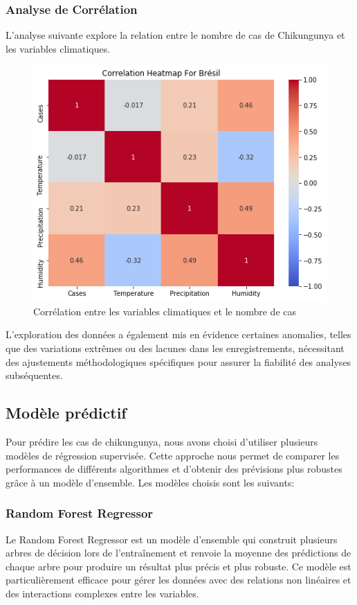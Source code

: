 \subsubsection*{Analyse de Corrélation}
L'analyse suivante explore la relation entre le nombre de cas de Chikungunya et les variables climatiques. 
\begin{figure}[h!]
	\centering
	\includegraphics[width=0.6\linewidth]{images/case_correlation}
	\caption[Corrélation entre les variables climatiques et le nombre de cas]{Corrélation entre les variables climatiques et le nombre de cas}
	\label{fig:casecorrelation}
\end{figure}

L'exploration des données a également mis en évidence certaines anomalies, telles que des variations extrêmes ou des lacunes dans les enregistrements, nécessitant des ajustements méthodologiques spécifiques pour assurer la fiabilité des analyses subséquentes.


\subsection{Modèle prédictif}
Pour prédire les cas de chikungunya, nous avons choisi d'utiliser plusieurs modèles de régression supervisée. Cette approche nous permet de comparer les performances de différents algorithmes et d'obtenir des prévisions plus robustes grâce à un modèle d'ensemble. Les modèles choisis sont les suivants:

\subsubsection{Random Forest Regressor}

Le Random Forest Regressor est un modèle d'ensemble qui construit plusieurs arbres de décision lors de l'entraînement et renvoie la moyenne des prédictions de chaque arbre pour produire un résultat plus précis et plus robuste. Ce modèle est particulièrement efficace pour gérer les données avec des relations non linéaires et des interactions complexes entre les variables.

